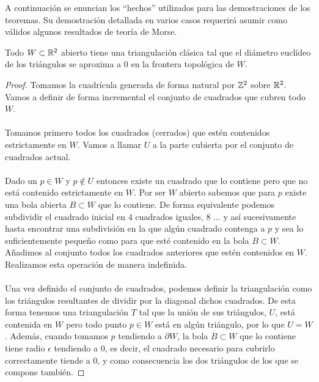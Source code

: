 
A continuación se enuncian los ``hechos'' utilizados para las demostraciones de los teoremas. Su demostración detallada en varios casos requerirá asumir como válidos algunos resultados de teoría de Morse.

\begin{hecho}
	Todo $W \subset \mathbb{R}^2$ abierto tiene una triangulación clásica tal que el diámetro euclídeo de los triángulos se aproxima a $0$ en la frontera topológica de $W$.
\end{hecho}

\begin{proof}
	Tomamos la cuadrícula generada de forma natural por $\mathbb{Z}^2$ sobre $\mathbb{R}^2$. Vamos a definir de forma incremental el conjunto de cuadrados que cubren todo $W$.\\
	\\ Tomamos primero todos los cuadrados (cerrados) que estén contenidos estrictamente en $W$. Vamos a llamar $U$ a la parte cubierta por el conjunto de cuadrados actual.\\
	\\ Dado un $p \in W$ y $p \not \in U$ entonces existe un cuadrado que lo contiene pero que no está contenido estrictamente en $W$. Por ser $W$ abierto sabemos que para $p$ existe una bola abierta $B \subset W$ que lo contiene. De forma equivalente podemos subdividir el cuadrado inicial en $4$ cuadrados iguales, $8$ ... y así sucesivamente hasta encontrar una subdivisión en la que algún cuadrado contenga a $p$ y sea lo suficientemente pequeño como para que esté contenido en la bola $B \subset W$. Añadimos al conjunto todos los cuadrados anteriores que estén contenidos en $W$. Realizamos esta operación de manera indefinida.\\
	\\ Una vez definido el conjunto de cuadrados, podemos definir la triangulación como los triángulos resultantes de dividir por la diagonal dichos cuadrados. De esta forma tenemos una triangulación $T$ tal que la unión de sus triángulos, $U$, está contenida en $W$ pero todo punto $p \in W$ está en algún triángulo, por lo que $U = W$. Además, cuando tomamos $p$ tendiendo a $\partial W$, la bola $B \subset W$ que lo contiene tiene radio $\epsilon$ tendiendo a $0$, es decir, el cuadrado necesario para cubrirlo correctamente tiende a $0$, y como consecuencia los dos triángulos de los que se compone también.
\end{proof}

